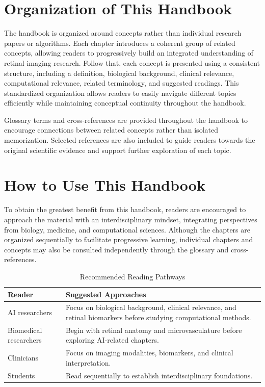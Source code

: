 \section*{Organization of This Handbook}

The handbook is organized around concepts rather than individual research papers or algorithms. Each chapter introduces a coherent group of related concepts, allowing readers to progressively build an integrated understanding of retinal imaging research. Follow that, each concept is presented using a consistent structure, including a definition, biological background, clinical relevance, computational relevance, related terminology, and suggested readings. This standardized organization allows readers to easily navigate different topics efficiently while maintaining conceptual continuity throughout the handbook.

Glossary terms and cross-references are provided throughout the handbook to encourage connections between related concepts rather than isolated memorization. Selected references are also included to guide readers towards the original scientific evidence and support further exploration of each topic. 

\section*{How to Use This Handbook}

To obtain the greatest benefit from this handbook, readers are encouraged to approach the material with an interdisciplinary mindset, integrating perspectives from biology, medicine, and computational sciences. Although the chapters are organized sequentially to facilitate progressive learning, individual chapters and concepts may also be consulted independently through the glossary and cross-references.

\begin{table}[h]
    \centering
    \caption{Recommended Reading Pathways}
    \begin{tabularx}{\textwidth}{lX}
        \toprule
        \textbf{Reader} & \textbf{Suggested Approaches} \\
        \midrule
        AI researchers & Focus on biological background, clinical relevance, and retinal biomarkers before studying computational methods. \\
        Biomedical researchers & Begin with retinal anatomy and microvasculature before exploring AI-related chapters. \\
        Clinicians & Focus on imaging modalities, biomarkers, and clinical interpretation. \\
        Students &Read sequentially to establish interdisciplinary foundations. \\
        \bottomrule
    \end{tabularx}
\end{table}

